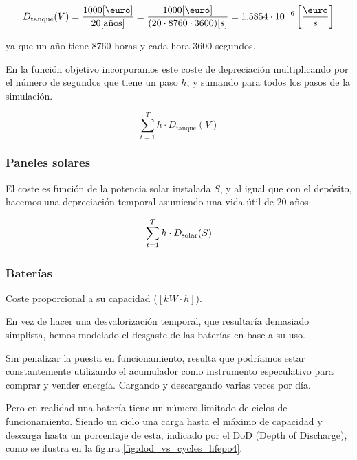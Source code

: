 \begin{equation}
	D_\text{tanque}(V) = \frac{1000[\text{\euro}]}{20[\text{años}]} = \frac{1000[\text{\euro}]}{(20 \cdot 8760 \cdot 3600)[s]} = 1.5854 \cdot 10^{-6} \left[\frac{\text{\euro}}{s}\right]
\end{equation}

ya que un año tiene 8760 horas y cada hora 3600 segundos.

En la función objetivo incorporamos este coste de depreciación multiplicando
por el número de segundos que tiene un paso $h$, y sumando para todos los pasos
de la simulación.

\begin{equation}
	\sum_{t=1}^{T} h \cdot D_\text{tanque}(V)
\end{equation}


\subsubsection{Paneles solares}

El coste es función de la potencia solar instalada $S$, y al igual que con el
depósito, hacemos una depreciación temporal asumiendo una vida útil de 20
años.

\begin{equation}
	\sum_{t=1}^{T} h \cdot D_\text{solar}(S)                                                                                                        \\
\end{equation}


\subsubsection{Baterías}

Coste proporcional a su capacidad ($[kW \cdot h]$).

En vez de hacer una desvalorización temporal, que resultaría demasiado
simplista, hemos modelado el desgaste de las baterías en base a su uso.

Sin penalizar la puesta en funcionamiento, resulta que podríamos estar
constantemente utilizando el acumulador como instrumento especulativo para
comprar y vender energía. Cargando y descargando varias veces por día.

Pero en realidad una batería tiene un número limitado de ciclos de funcionamiento.
Siendo un ciclo una carga hasta el máximo de capacidad y descarga hasta un
porcentaje de esta, indicado por el DoD (Depth of Discharge), como se ilustra
en la figura \ref{fig:dod_vs_cycles_lifepo4}.

